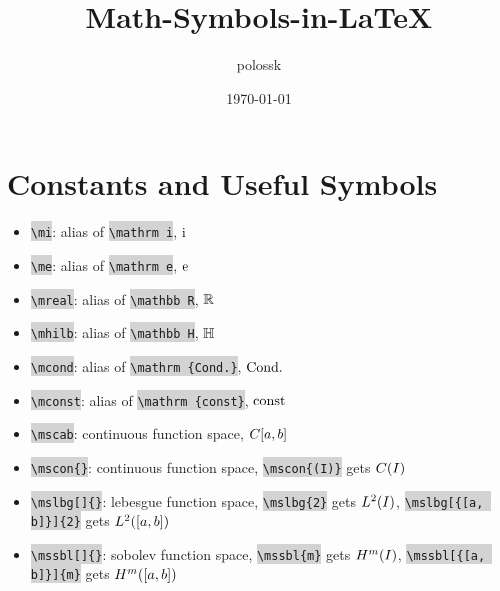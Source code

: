 \documentclass{article}
\title{Math-Symbols-in-\LaTeX{}}
\author{polossk}
\date{\today}
\begin{document}
\maketitle
\thispagestyle{fancy}
\renewcommand{\baselinestretch}{1.25}
\sWuhao\fSong

\newcommand\mtex[1]{\colorbox{lightgray}{\color{darkred} {\tt \textbackslash#1}}}
\newcommand\code[1]{\colorbox{lightgray}{\color{darkred} {\tt #1}}}

\section{Constants and Useful Symbols}
\begin{itemize}
\item \mtex{mi}: alias of \mtex{mathrm i}, $\mi$
\item \mtex{me}: alias of \mtex{mathrm e}, $\me$
\item \mtex{mreal}: alias of \mtex{mathbb R}, $\mreal$
\item \mtex{mhilb}: alias of \mtex{mathbb H}, $\mhilb$
\item \mtex{mcond}: alias of \mtex{mathrm \{Cond.\}}, $\mcond$
\item \mtex{mconst}: alias of \mtex{mathrm \{const\}}, $\mconst$
\item \mtex{mscab}: continuous function space, $\mscab$
\item \mtex{mscon\{\}}: continuous function space, \mtex{mscon\{(I)\}} gets $\mscon{(I)}$
\item \mtex{mslbg[]\{\}}: lebesgue function space, \mtex{mslbg\{2\}} gets $\mslbg{2}$, \mtex{mslbg[\{[a, b]\}]\{2\}} gets $\mslbg[{[a, b]}]{2}$
\item \mtex{mssbl[]\{\}}: sobolev function space, \mtex{mssbl\{m\}} gets $\mssbl{m}$, \mtex{mssbl[\{[a, b]\}]\{m\}} gets $\mssbl[{[a, b]}]{m}$
\end{itemize}
\end{document}
